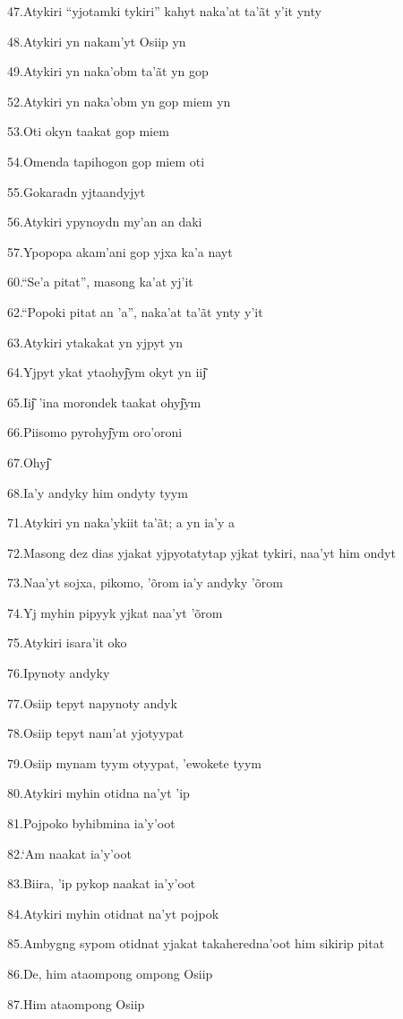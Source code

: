 47.Atykiri ``yjotamki tykiri'' kahyt naka'at ta'ãt y'it ynty

48.Atykiri yn nakam'yt Osiip yn

49.Atykiri yn naka'obm ta'ãt yn gop

52.Atykiri yn naka'obm yn gop miem yn

53.Oti okyn taakat gop miem

54.Omenda tapihogon gop miem oti

55.Gokaradn yjtaandyjyt

56.Atykiri ypynoydn my'an an daki

57.Ypopopa akam'ani gop yjxa ka'a nayt

60.``Se'a pitat'', masong ka'at yj'it

62.``Popoki pitat an 'a'', naka'at ta'ãt ynty y'it

63.Atykiri ytakakat yn yjpyt yn

64.Yjpyt ykat ytaohyj͂ym okyt yn iij͂

\protect\hypertarget{_heading=h.4d34og8}{}{}65.Iij͂ 'ina morondek taakat
ohyj͂ym

66.Piisomo pyrohyj͂ym oro'oroni

67.Ohyj͂

68.Ia'y andyky him ondyty tyym

71.Atykiri yn naka'ykiit ta'ãt; a yn ia'y a

72.Masong dez dias yjakat yjpyotatytap yjkat tykiri, naa'yt him ondyt

73.Naa'yt sojxa, pikomo, 'õrom ia'y andyky 'õrom

74.Yj myhin pipyyk yjkat naa'yt 'õrom

75.Atykiri isara'it oko

76.Ipynoty andyky

77.Osiip tepyt napynoty andyk

78.Osiip tepyt nam'at yjotyypat

79.Osiip mynam tyym otyypat, 'ewokete tyym

80.Atykiri myhin otidna na'yt 'ip

81.Pojpoko byhibmina ia'y'oot

82.`Am naakat ia'y'oot

83.Biira, 'ip pykop naakat ia'y'oot

84.Atykiri myhin otidnat na'yt pojpok

85.Ambygng sypom otidnat yjakat takaheredna'oot him sikirip pitat

86.De, him ataompong ompong Osiip

87.Him ataompong Osiip

